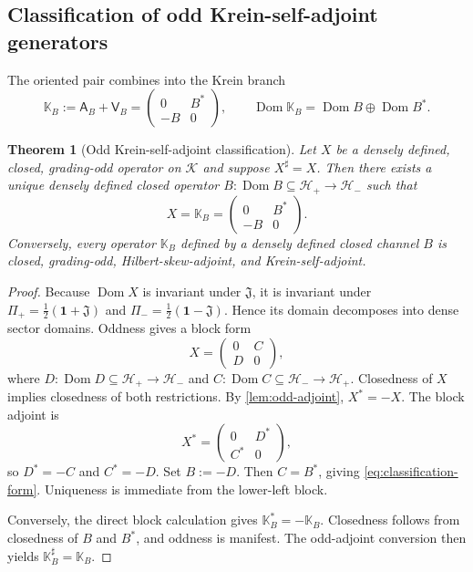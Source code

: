 \documentclass[11pt,reqno]{scrartcl}
\newcommand{\scrK}{\mathscr K}
\newcommand{\scrHp}{\mathscr H_{+}}
\newcommand{\scrHm}{\mathscr H_{-}}
\newcommand{\fundJ}{\mathfrak J}
\newcommand{\Pp}{\Pi_{+}}
\newcommand{\Pm}{\Pi_{-}}
\newcommand{\idop}{\mathbf 1}
\newcommand{\Aop}{\mathsf A}
\newcommand{\Vop}{\mathsf V}
\newcommand{\KB}{\mathbb K}
\DeclareMathOperator{\Dom}{Dom}
\theoremstyle{plain}
\newtheorem{theorem}{Theorem}[section]
\theoremstyle{definition}
\theoremstyle{remark}
\begin{document}
\subsection{Classification of odd Krein-self-adjoint generators}

The oriented pair combines into the Krein branch
\begin{equation}
  \KB_B:=\Aop_B+\Vop_B
  =
  \begin{pmatrix}
    0&B^*\\
    -B&0
  \end{pmatrix},
  \qquad
  \Dom\KB_B=\Dom B\oplus\Dom B^*.
  \label{eq:KB}
\end{equation}

\begin{theorem}[Odd Krein-self-adjoint classification]
\label{thm:classification}
Let \(X\) be a densely defined, closed, grading-odd operator on
\(\scrK\) and suppose \(X^\sharp=X\). Then
there exists a unique densely defined closed operator
\(B:\Dom B\subseteq\scrHp\to\scrHm\) such that
\begin{equation}
  X=\KB_B
  =
  \begin{pmatrix}
    0&B^*\\
    -B&0
  \end{pmatrix}.
  \label{eq:classification-form}
\end{equation}
Conversely, every operator \(\KB_B\) defined by a densely defined closed
channel \(B\) is closed, grading-odd, Hilbert-skew-adjoint, and
Krein-self-adjoint.
\end{theorem}

\begin{proof}
Because \(\Dom X\) is invariant under \(\fundJ\), it is invariant under
\(\Pp=\tfrac12(\idop+\fundJ)\) and
\(\Pm=\tfrac12(\idop-\fundJ)\). Hence its domain decomposes into dense sector
domains. Oddness gives a block form
\begin{equation}
  X=
  \begin{pmatrix}
    0&C\\
    D&0
  \end{pmatrix},
\end{equation}
where
\(D:\Dom D\subseteq\scrHp\to\scrHm\) and
\(C:\Dom C\subseteq\scrHm\to\scrHp\). Closedness of \(X\) implies
closedness of both restrictions. By \cref{lem:odd-adjoint},
\(X^*=-X\). The block adjoint is
\begin{equation}
  X^*=
  \begin{pmatrix}
    0&D^*\\
    C^*&0
  \end{pmatrix},
\end{equation}
so \(D^*=-C\) and \(C^*=-D\). Set \(B:=-D\). Then \(C=B^*\), giving
\eqref{eq:classification-form}. Uniqueness is immediate from the lower-left
block.

Conversely, the direct block calculation gives \(\KB_B^*=-\KB_B\).
Closedness follows from closedness of \(B\) and \(B^*\), and oddness is
manifest. The odd-adjoint conversion then yields \(\KB_B^\sharp=\KB_B\).
\end{proof}
\end{document}
